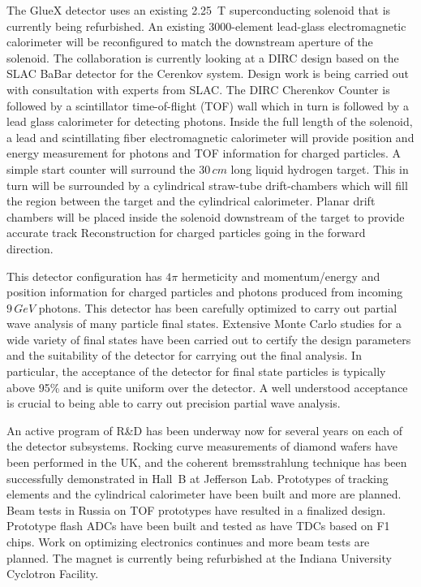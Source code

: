 \hspace{1cm}
The GlueX detector uses an existing 2.25~T 
superconducting solenoid that is currently being refurbished.  An existing 
3000-element lead-glass electromagnetic calorimeter will be reconfigured 
to match the downstream aperture of the solenoid. The collaboration is
currently looking at a DIRC design based on the SLAC BaBar detector for the
Cerenkov system. Design work is being carried out with consultation 
with experts from SLAC. The DIRC Cherenkov Counter is followed by a scintillator 
time-of-flight (TOF) wall which in turn is followed by a lead glass 
calorimeter for detecting photons.  Inside the full length of the solenoid,
a lead and scintillating fiber electromagnetic calorimeter will provide 
position and energy measurement for photons and TOF information for charged 
particles.  A simple start counter will surround the $30\, cm$ long liquid hydrogen
target. This in turn will be surrounded by a cylindrical straw-tube drift-chambers 
which will fill the region between the target and the cylindrical calorimeter.  
Planar drift chambers will be placed inside the solenoid downstream of the target
to provide accurate track Reconstruction for charged particles going in the 
forward direction.


\hspace{1cm}
This detector configuration has $4 \pi$ hermeticity and momentum/energy and
position information for charged particles and photons produced from 
incoming $9\, GeV$ photons. This detector has been carefully optimized to 
carry out partial wave analysis of many particle final states.  Extensive Monte 
Carlo studies for a wide variety of final states have been carried out to 
certify the design parameters and the suitability of the detector for carrying 
out the final analysis. In particular, the acceptance of the detector for
final state particles is typically above 95\% and is quite uniform over 
the detector. A well understood acceptance is crucial to being able to carry
out precision partial wave analysis. 


\hspace{1cm}
An active program of R\&D has been underway now for several years on each of the 
detector subsystems. Rocking curve measurements of diamond wafers have 
been performed  in the UK, and the coherent bremsstrahlung technique has been 
successfully demonstrated in Hall~B at Jefferson Lab. Prototypes of tracking 
elements and the cylindrical calorimeter have been built and more are planned.  
Beam tests in Russia on TOF prototypes have resulted in a finalized design.  
Prototype flash ADCs have been built and tested as have TDCs based on F1 chips.  
Work on optimizing electronics continues and more beam tests are planned.  
The magnet is currently being refurbished at the Indiana University Cyclotron 
Facility. 

